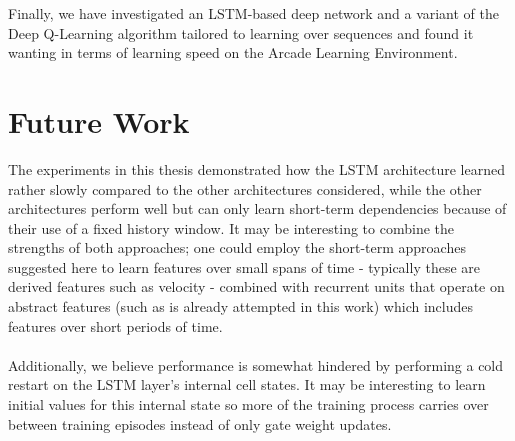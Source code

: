 Finally,
we have investigated an LSTM-based deep network
and a variant of the Deep Q-Learning algorithm
tailored to learning over sequences
and found it wanting in terms of learning speed
on the Arcade Learning Environment.

\section{Future Work}
\label{sec:future_work}
The experiments in this thesis
demonstrated how the LSTM architecture learned rather slowly
compared to the other architectures considered,
while the other architectures perform well
but can only learn short-term dependencies
because of their use of a fixed history window.
It may be interesting to combine the strengths of both approaches;
one could employ the short-term approaches suggested here
to learn features over small spans of time
- typically these are derived features such as velocity -
combined with recurrent units that operate
on abstract features
(such as is already attempted in this work)
which includes features over short periods of time.

\paragraph{}
Additionally,
we believe performance is somewhat hindered
by performing a cold restart on the LSTM layer's
internal cell states.
It may be interesting to learn initial values
for this internal state
so more of the training process carries over
between training episodes
instead of only gate weight updates.
